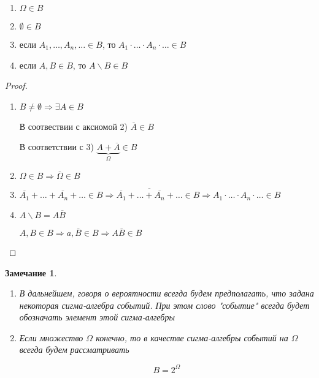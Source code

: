 \documentclass[a4paper, 14pt]{report}
\newtheorem{note}{Замечание}[section]
\begin{document}
\begin{enumerate}
    \item $\Omega \in B$
    \item $\emptyset \in B$
    \item если $A_1, \dots, A_n, \dots \in B$, то $A_1 \cdot \dots \cdot A_n \cdot \dots \in B$
    \item если $A,B \in B$, то $A \backslash B \in B$
\end{enumerate}

\begin{proof}
\hfil

    \begin{enumerate}
        \item $B \ne \emptyset \Rightarrow \exists A \in B$

            В соотвествии с аксиомой 2) $\overline{A} \in B$

            В соответствии с 3) $\underbrace{A + \overline{A}}_{\Omega} \in B$

        \item $\Omega \in B \Rightarrow \overline{\Omega} \in B$

        \item $\overline{A_1} + \dots + \overline{A_n} + \dots \in B \Rightarrow \overline{\overline{A_1} + \dots + \overline{A_n} + \dots} \in B \Rightarrow A_1 \cdot \dots \cdot A_n \cdot \dots \in B$

        \item $A \backslash B = A \overline{B}$

            $A, B \in B \Rightarrow a, \overline{B} \in B \Rightarrow A \overline{B} \in B$
    \end{enumerate}
\end{proof}

\begin{note}
    \begin{enumerate}
        \item В дальнейшем, говоря о вероятности всегда будем предполагать, что задана некоторая сигма-алгебра событий. При этом слово "событие" всегда будет обозначать элемент этой сигма-алгебры
        \item Если множество $\Omega$ конечно, то в качестве сигма-алгебры событий на $\Omega$ всегда будем рассматривать

            $$
            B = 2^\Omega
            $$
    \end{enumerate}
\end{note}
\end{document}

